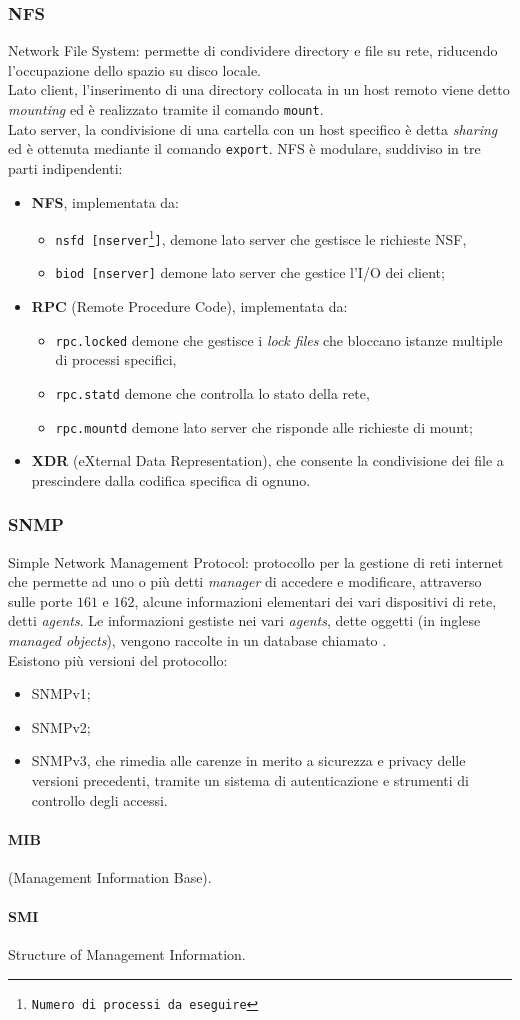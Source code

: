 \documentclass[a4paper,11pt]{article}
\def\code#1{\texttt{#1}}
\def\subsub#1{\subsubsection{#1}\label{#1}}
\def\para#1{\paragraph{#1}\label{#1}}
\def\vedi#1{\nameref{#1}}
\def\italic#1{\textit{#1}}
\begin{document}
\subsub{NFS}
Network File System: permette di condividere directory e file su rete, riducendo l'occupazione dello spazio su disco locale.\\Lato client, l'inserimento di una directory collocata in un host remoto viene detto \italic{mounting} ed è realizzato tramite il comando \code{mount}.\\
Lato server, la condivisione di una cartella con un host specifico è detta \italic{sharing} ed è ottenuta mediante il comando \code{export}.
NFS è modulare, suddiviso in tre parti indipendenti:
\begin{itemize}
\item \textbf{NFS}, implementata da: 
\begin{itemize}
\item \code{nsfd [nserver\footnote{Numero di processi da eseguire}]}, demone lato server  che gestisce le richieste NSF,
\item \code{biod [nserver]} demone lato server che gestice l'I/O dei client;
\end{itemize}
\item \textbf{RPC} (Remote Procedure Code), implementata da:
\begin{itemize}
\item \code{rpc.locked} demone che gestisce i \italic{lock files} che bloccano istanze multiple di processi specifici,
\item \code{rpc.statd} demone che controlla lo stato della rete,
\item \code{rpc.mountd} demone lato server che risponde alle richieste di mount;
\end{itemize}
\item \textbf{XDR} (eXternal Data Representation), che consente la condivisione dei file a prescindere dalla codifica specifica di ognuno.
\end{itemize} 
\subsub{SNMP}  %
Simple Network Management Protocol: protocollo per la gestione di reti internet che permette ad uno o più \vedi{DTE} detti \italic{manager} di accedere e modificare, attraverso \vedi{UDP} sulle porte $161$ e $162$, alcune informazioni elementari dei vari dispositivi di rete, detti \italic{agents}. Le informazioni gestiste nei vari \italic{agents}, dette 
oggetti (in inglese \italic{managed objects}), vengono raccolte in un database chiamato \vedi{MIB}.
\\Esistono più versioni del protocollo:
\begin{itemize}
\item SNMPv1;
\item SNMPv2;
\item SNMPv3, che rimedia alle carenze in merito a sicurezza e privacy delle versioni precedenti, tramite un sistema di autenticazione e strumenti di controllo degli accessi.
\end{itemize}
\para{MIB} (Management Information Base).
\para{SMI} Structure of Management Information.
 
\end{document}
